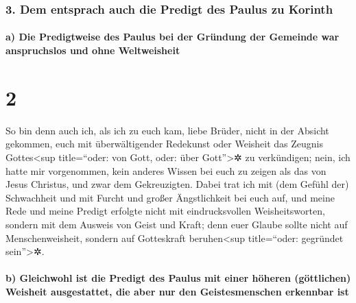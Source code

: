 \hypertarget{dem-entsprach-auch-die-predigt-des-paulus-zu-korinth}{%
\subsubsection{3. Dem entsprach auch die Predigt des Paulus zu
Korinth}\label{dem-entsprach-auch-die-predigt-des-paulus-zu-korinth}}

\hypertarget{a-die-predigtweise-des-paulus-bei-der-gruxfcndung-der-gemeinde-war-anspruchslos-und-ohne-weltweisheit}{%
\paragraph{a) Die Predigtweise des Paulus bei der Gründung der Gemeinde
war anspruchslos und ohne
Weltweisheit}\label{a-die-predigtweise-des-paulus-bei-der-gruxfcndung-der-gemeinde-war-anspruchslos-und-ohne-weltweisheit}}

\hypertarget{section-1}{%
\section{2}\label{section-1}}

 So bin denn auch ich, als ich zu euch kam, liebe Brüder,
nicht in der Absicht gekommen, euch mit überwältigender Redekunst oder
Weisheit das Zeugnis Gottes\textless sup title=``oder: von Gott, oder:
über Gott''\textgreater✲ zu verkündigen;  nein, ich hatte
mir vorgenommen, kein anderes Wissen bei euch zu zeigen als das von
Jesus Christus, und zwar dem Gekreuzigten.  Dabei trat ich
mit (dem Gefühl der) Schwachheit und mit Furcht und großer Ängstlichkeit
bei euch auf,  und meine Rede und meine Predigt erfolgte
nicht mit eindrucksvollen Weisheitsworten, sondern mit dem Ausweis von
Geist und Kraft;  denn euer Glaube sollte nicht auf
Menschenweisheit, sondern auf Gotteskraft beruhen\textless sup
title=``oder: gegründet sein''\textgreater✲.

\hypertarget{b-gleichwohl-ist-die-predigt-des-paulus-mit-einer-huxf6heren-guxf6ttlichen-weisheit-ausgestattet-die-aber-nur-den-geistesmenschen-erkennbar-ist}{%
\paragraph{b) Gleichwohl ist die Predigt des Paulus mit einer höheren
(göttlichen) Weisheit ausgestattet, die aber nur den Geistesmenschen
erkennbar
ist}\label{b-gleichwohl-ist-die-predigt-des-paulus-mit-einer-huxf6heren-guxf6ttlichen-weisheit-ausgestattet-die-aber-nur-den-geistesmenschen-erkennbar-ist}}

